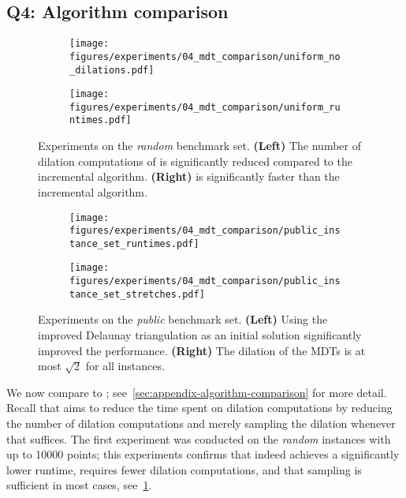 \subsection{Q4: Algorithm comparison}
\label{sec:experiments-algorithm-comparison}
\begin{figure}
    \begin{subfigure}[t]{0.49\linewidth}
        \centering
        \texttt{[image: figures/experiments/04\_mdt\_comparison/uniform\_no\_dilations.pdf]}
    \end{subfigure}\hfill
    \begin{subfigure}[t]{0.49\linewidth}
        \centering
        \texttt{[image: figures/experiments/04\_mdt\_comparison/uniform\_runtimes.pdf]}
    \end{subfigure}
    \caption{Experiments on the \emph{random} benchmark set.
             \textbf{(Left)} The number of dilation computations of \binmdt{} is significantly reduced compared to the incremental algorithm.
             \textbf{(Right)} \binmdt{} is significantly faster than the incremental algorithm.}
    \label{fig:experiments-algorithm-comparison}
\end{figure}
\begin{figure}
    \begin{subfigure}[t]{0.49\linewidth}
        \centering
        \texttt{[image: figures/experiments/04\_mdt\_comparison/public\_instance\_set\_runtimes.pdf]}
    \end{subfigure}\hfill
    \begin{subfigure}[t]{0.49\linewidth}
        \centering
        \texttt{[image: figures/experiments/04\_mdt\_comparison/public\_instance\_set\_stretches.pdf]}
    \end{subfigure}
    \caption{Experiments on the \emph{public} benchmark set.
             \textbf{(Left)} Using the improved Delaunay triangulation as an initial solution significantly improved the performance.
             \textbf{(Right)} The dilation of the MDTs is at most $\sqrt{2}$ for all instances.}
    \label{fig:experiments-public-instance-set}
\end{figure}

We now compare \incmdt{} to \binmdt{}; see~\cref{sec:appendix-algorithm-comparison} for more detail.
Recall that \binmdt{} aims to reduce the time spent on dilation computations by 
reducing the number of dilation computations and merely sampling the dilation whenever that suffices.
The first experiment was conducted on the \emph{random} instances with up to \num{10000} points;
this experiments confirms that \binmdt{} indeed achieves a significantly lower runtime,
requires fewer dilation computations, and that sampling is sufficient in most cases, see~\cref{fig:experiments-algorithm-comparison}.

